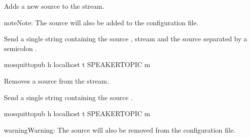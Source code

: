 \documentclass[letterpaper,10pt,english]{sphinxmanual}
\begin{document}
\begin{fulllineitems}
\begin{fulllineitems}
\end{fulllineitems}



\begin{fulllineitems}

\pysigstartsignatures
{}
\pysigstopsignatures
\sphinxAtStartPar
Adds a new source to the stream.

\begin{sphinxadmonition}{note}{Note:}
\sphinxAtStartPar
The source will also be added to the configuration file.
\end{sphinxadmonition}

\sphinxAtStartPar
Send a single string containing the source , stream  and the source 
separated by a semicolon \sphinxcode{\sphinxupquote{;}}.

\begin{sphinxVerbatim}[commandchars=\\\{\}]
mosquitto\PYGZus{}pub \PYGZhy{}h localhost \PYGZhy{}t \PYGZpc{}SPEAKER\PYGZus{}TOPIC \PYGZhy{}m 
\end{sphinxVerbatim}

\end{fulllineitems}



\begin{fulllineitems}

\pysigstartsignatures
{}
\pysigstopsignatures
\sphinxAtStartPar
Removes a source from the stream.

\sphinxAtStartPar
Send a single string containing the source .

\begin{sphinxVerbatim}[commandchars=\\\{\}]
mosquitto\PYGZus{}pub \PYGZhy{}h localhost \PYGZhy{}t \PYGZpc{}SPEAKER\PYGZus{}TOPIC \PYGZhy{}m 
\end{sphinxVerbatim}

\begin{sphinxadmonition}{warning}{Warning:}
\sphinxAtStartPar
The source will also be removed from the configuration file.
\end{sphinxadmonition}

\end{fulllineitems}


\end{fulllineitems}
\end{document}
